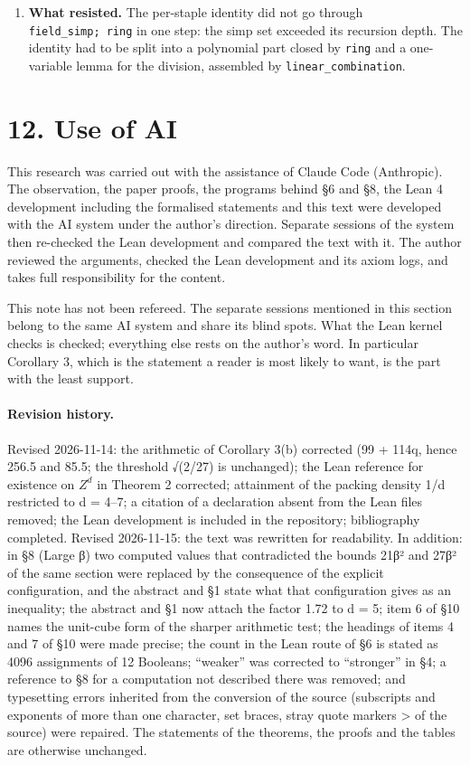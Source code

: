\documentclass[11pt,a4paper]{article}
\theoremstyle{named}
\begin{document}
\begin{enumerate}
\item[7.] \textbf{What resisted.} The per-staple identity did not go through \texttt{field\_\allowbreak{}simp;\ \allowbreak{}ring} in one step: the simp set exceeded its recursion depth. The identity had to be split into a polynomial part closed by \texttt{ring} and a one-variable lemma for the division, assembled by \texttt{linear\_\allowbreak{}combination}.
\end{enumerate}

\section*{12. Use of AI}

This research was carried out with the assistance of Claude Code (Anthropic). The observation, the paper proofs, the programs behind §6 and §8, the Lean 4 development including the formalised statements and this text were developed with the AI system under the author's direction. Separate sessions of the system then re-checked the Lean development and compared the text with it. The author reviewed the arguments, checked the Lean development and its axiom logs, and takes full responsibility for the content.

This note has not been refereed. The separate sessions mentioned in this section belong to the same AI system and share its blind spots. What the Lean kernel checks is checked; everything else rests on the author's word. In particular Corollary 3, which is the statement a reader is most likely to want, is the part with the least support.

\paragraph{Revision history.} Revised 2026-11-14: the arithmetic of Corollary 3(b) corrected (99 + 114q, hence 256.5 and 85.5; the threshold √(2/27) is unchanged); the Lean reference for existence on $Z^d$ in Theorem 2 corrected; attainment of the packing density 1/d restricted to d = 4–7; a citation of a declaration absent from the Lean files removed; the Lean development is included in the repository; bibliography completed. Revised 2026-11-15: the text was rewritten for readability. In addition: in §8 (Large β) two computed values that contradicted the bounds 21β² and 27β² of the same section were replaced by the consequence of the explicit configuration, and the abstract and §1 state what that configuration gives as an inequality; the abstract and §1 now attach the factor 1.72 to d = 5; item 6 of §10 names the unit-cube form of the sharper arithmetic test; the headings of items 4 and 7 of §10 were made precise; the count in the Lean route of §6 is stated as 4096 assignments of 12 Booleans; ``weaker'' was corrected to ``stronger'' in §4; a reference to §8 for a computation not described there was removed; and typesetting errors inherited from the conversion of the source (subscripts and exponents of more than one character, set braces, stray quote markers \textgreater{} of the source) were repaired. The statements of the theorems, the proofs and the tables are otherwise unchanged.
\end{document}
